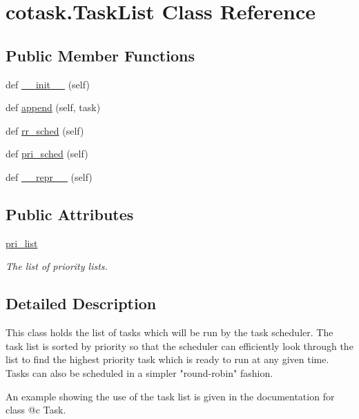 \hypertarget{classcotask_1_1_task_list}{}\section{cotask.\+Task\+List Class Reference}
\label{classcotask_1_1_task_list}
\subsection*{Public Member Functions}
\begin{DoxyCompactItemize}
\item 
def \mbox{\hyperlink{classcotask_1_1_task_list_a288413cdeddf60664542a92ce201200a}{\+\_\+\+\_\+init\+\_\+\+\_\+}} (self)
\item 
def \mbox{\hyperlink{classcotask_1_1_task_list_aa690015d692390e17cb777ff367ae159}{append}} (self, task)
\item 
def \mbox{\hyperlink{classcotask_1_1_task_list_a01614098aedc87b465d5525c6ccb47ce}{rr\+\_\+sched}} (self)
\item 
def \mbox{\hyperlink{classcotask_1_1_task_list_a5f7b264614e8e22c28d4c1509e3f30d8}{pri\+\_\+sched}} (self)
\item 
def \mbox{\hyperlink{classcotask_1_1_task_list_aa0632311ba902d3e5d75167dd4215dda}{\+\_\+\+\_\+repr\+\_\+\+\_\+}} (self)
\end{DoxyCompactItemize}
\subsection*{Public Attributes}
\begin{DoxyCompactItemize}
\item 
\mbox{\hyperlink{classcotask_1_1_task_list_aac6e53cb4fec80455198ff85c85a4b51}{pri\+\_\+list}}
\begin{DoxyCompactList}\small\item\em The list of priority lists. \end{DoxyCompactList}\end{DoxyCompactItemize}


\subsection{Detailed Description}
\begin{DoxyVerb}This class holds the list of tasks which will be run by the task 
scheduler. The task list is sorted by priority so that the scheduler can 
efficiently look through the list to find the highest priority task which
is ready to run at any given time. Tasks can also be scheduled in a 
simpler "round-robin" fashion. 

An example showing the use of the task list is given in the documentation
for class @c Task. \end{DoxyVerb}
 

